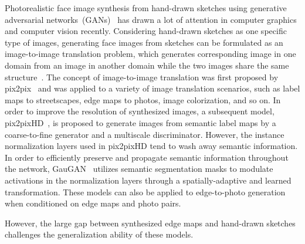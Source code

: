 \documentclass{article}
\newcommand{\cxj}[1]{\textcolor{red}{(Cxj: #1)}}
\begin{document}
Photorealistic face image synthesis from hand-drawn sketches using generative adversarial networks~(GANs)~\cite{gan} has drawn a lot of attention in computer graphics and computer vision recently. Considering hand-drawn sketches as one specific type of images, generating face images from sketches can be formulated as an image-to-image translation problem, which generates corresponding image in one domain from an image in another domain while the two images share the same structure~\cite{cyclegan,bicyclegan,spagan,munit,crn,cfgan,sis,maskgan}.
The concept of image-to-image translation was first proposed by pix2pix~\cite{pix2pix} and was applied to a variety of image translation scenarios, such as label maps to streetscapes, edge maps to photos, image colorization, and so on.
In order to improve the resolution of synthesized images, a subsequent model, pix2pixHD~\cite{pix2pixhd}, is proposed to generate images from semantic label maps by a coarse-to-fine generator and a multiscale discriminator. 
However, the instance normalization layers used in pix2pixHD tend to wash away semantic information.
In order to efficiently preserve and propagate semantic information throughout the network, GauGAN~\cite{spade} utilizes semantic segmentation masks to modulate activations in the normalization layers through a spatially-adaptive and learned transformation. 
%
These models can also be applied to edge-to-photo generation when conditioned on edge maps and photo pairs.

However, the large gap between synthesized edge maps and hand-drawn sketches challenges the generalization ability of these models.
\end{document}
